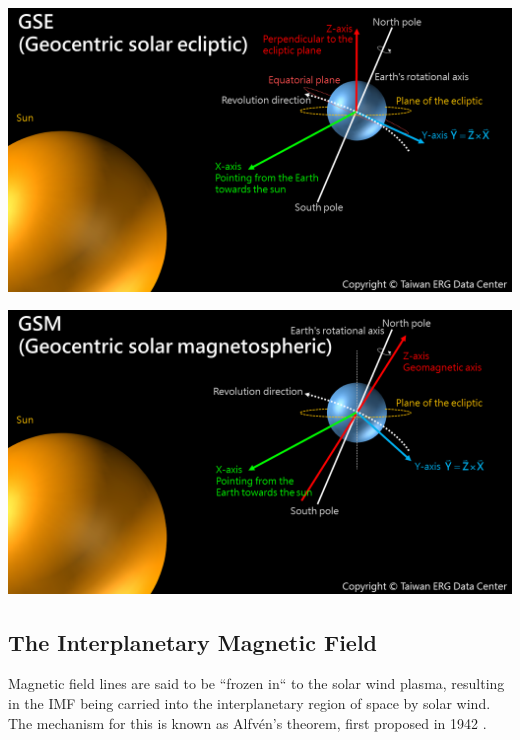 \documentclass[12pt]{article}
\newenvironment{Figure}
  {\par\medskip\noindent\minipage{\linewidth}}
  {\endminipage\par\medskip}
\begin{document}
\begin{Figure}
    \begin{minipage}[c]{0.48\textwidth}
        \centering
        \includegraphics[width=\textwidth]{GSE.png}
    \end{minipage}
    \begin{minipage}[c]{0.48\textwidth}
        \centering
        \includegraphics[width=\textwidth]{GSM.png}
    \end{minipage}
\end{Figure}

\subsection{The Interplanetary Magnetic Field}
Magnetic field lines are said to be ``frozen in`` to the solar wind plasma, resulting in the IMF being carried into the interplanetary region of space by solar wind. The mechanism for this is known as Alfvén's theorem, first proposed in 1942 \cite{alfven_1942}. 
\end{document}
